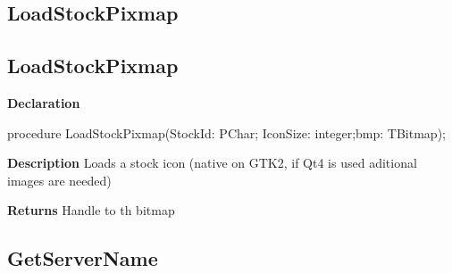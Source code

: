 \documentclass{report}
\newif\ifpdf
\begin{document}
\subsection*{\large{\textbf{LoadStockPixmap}}\normalsize\hspace{1ex}\hrulefill}
\else
\subsection*{LoadStockPixmap}
\fi
\label{licommon-LoadStockPixmap}
\begin{list}{}{
\setlength{\itemindent}{0cm}
\setlength{\listparindent}{0cm}
\setlength{\leftmargin}{\evensidemargin}
\addtolength{\leftmargin}{\tmplength}
\settowidth{\labelsep}{X}
\addtolength{\leftmargin}{\labelsep}
\setlength{\labelwidth}{\tmplength}
}
\item[\textbf{Declaration}\hfill]
\ifpdf
\begin{flushleft}
\fi
\begin{ttfamily}
procedure LoadStockPixmap(StockId: PChar; IconSize: integer;bmp: TBitmap);\end{ttfamily}

\ifpdf
\end{flushleft}
\fi

\par
\item[\textbf{Description}]
Loads a stock icon (native on GTK2, if Qt4 is used aditional images are needed) \par
\item[\textbf{Returns}]Handle to th bitmap


\end{list}
\ifpdf
\subsection*{\large{\textbf{GetServerName}}\normalsize\hspace{1ex}\hrulefill}
\else
\end{document}
